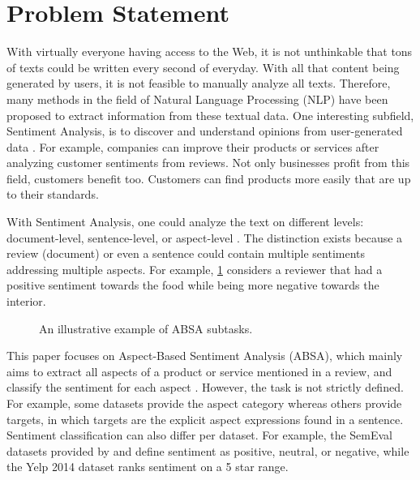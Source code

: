\documentclass[american, oneside]{ecsgdp}
\begin{document}
\section{Problem Statement} \label{sec:problem}
With virtually everyone having access to the Web, it is not unthinkable that tons of texts could be written every second of everyday. With all that content being generated by users, it is not feasible to manually analyze all texts. Therefore, many methods in the field of Natural Language Processing (NLP) have been proposed to extract information from these textual data. One interesting subfield, Sentiment Analysis, is to discover and understand opinions from user-generated data \parencite{Liu2012SAOP}. For example, companies can improve their products or services after analyzing customer sentiments from reviews. Not only businesses profit from this field, customers benefit too. Customers can find products more easily that are up to their standards.

With Sentiment Analysis, one could analyze the text on different levels: document-level, sentence-level, or aspect-level \parencite{Liu2012SAOP}. The distinction exists because a review (document) or even a sentence could contain multiple sentiments addressing multiple aspects. For example, \cref{fig:example_review} considers a reviewer that had a positive sentiment towards the food while being more negative towards the interior.

\begin{figure}[htbp]
  \centering
  
  \caption{An illustrative example of ABSA subtasks.}
  \label{fig:example_review}
\end{figure}

This paper focuses on Aspect-Based Sentiment Analysis (ABSA), which mainly aims to extract all aspects of a product or service mentioned in a review, and classify the sentiment for each aspect \parencite{Liu2012SAOP}. However, the task is not strictly defined. For example, some datasets provide the aspect category whereas others provide targets, in which targets are the explicit aspect expressions found in a sentence. Sentiment classification can also differ per dataset. For example, the SemEval datasets provided by \textcite{Pontiki2015SemEval} and \textcite{Pontiki2016SemEval} define sentiment as positive, neutral, or negative, while the Yelp 2014 dataset \parencite{Tang2016Yelp} ranks sentiment on a 5 star range.
\end{document}
